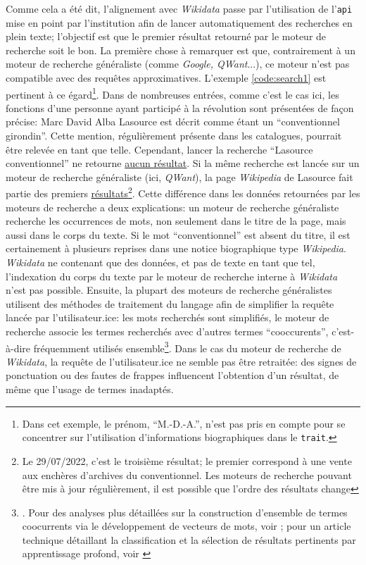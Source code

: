 \documentclass[a4paper, 12pt, twoside]{book}
\newcommand{\api}{\texttt{\gls{api}}}
\newcommand{\ttrait}{\texttt{trait}}
\newcommand{\wkd}{\textit{Wikidata}}
\begin{document}
Comme cela a été dit, l'alignement avec \wkd{} passe par l'utilisation de l'\api{} mise en point par l'institution afin de lancer automatiquement des recherches en plein texte; l'objectif est que le premier résultat retourné par le moteur de recherche soit le bon. La première chose à remarquer est que, contrairement à un moteur de recherche généraliste (comme \textit{Google, QWant}...), ce moteur n'est pas compatible avec des requêtes approximatives. L'exemple \ref{code:search1} est pertinent à ce égard\footnote{Dans cet exemple, le prénom, \enquote{M.-D.-A.}, n'est pas pris en compte pour se concentrer sur l'utilisation d'informations biographiques dans le \ttrait{}.}. Dans de nombreuses entrées, comme c'est le cas ici, les fonctions d'une personne ayant participé à la révolution sont présentées de façon précise: Marc David Alba Lasource est décrit comme étant un \enquote{conventionnel girondin}. Cette mention, régulièrement présente dans les catalogues, pourrait être relevée en tant que telle. Cependant, lancer la recherche \enquote{Lasource conventionnel} ne retourne \href{https://www.wikidata.org/w/index.php?search=lasource+conventionnel&title=Special:Search&profile=advanced&fulltext=1&ns0=1&ns120=1}{aucun résultat}. Si la même recherche est lancée sur un moteur de recherche généraliste (ici, \textit{QWant}), la page \textit{Wikipedia} de Lasource fait partie des premiers \href{https://www.qwant.com/?q=lasource+conventionnel}{résultats}\footnote{Le 29/07/2022, c'est le troisième résultat; le premier correspond à une vente aux enchères d'archives du conventionnel. Les moteurs de recherche pouvant être mis à jour régulièrement, il est possible que l'ordre des résultats change}. Cette différence dans les données retournées par les moteurs de recherche a deux explications: un moteur de recherche généraliste recherche les occurrences de mots, non seulement dans le titre de la page, mais aussi dans le corps du texte. Si le mot \enquote{conventionnel} est absent du titre, il est certainement à plusieurs reprises dans une notice biographique type \textit{Wikipedia}. \wkd{} ne contenant que des données, et pas de texte en tant que tel, l'indexation du corps du texte par le moteur de recherche interne à \wkd{} n'est pas possible. Ensuite, la plupart des moteurs de recherche généralistes utilisent des méthodes de traitement du langage afin de simplifier la requête lancée par l'utilisateur.ice: les mots recherchés sont simplifiés, le moteur de recherche associe les termes recherchés avec d'autres termes \enquote{cooccurents}, c'est-à-dire fréquemment utilisés ensemble\footnote{\cite{noauthor_moteur_2022}. Pour des analyses plus détaillées sur la construction d'ensemble de termes coocurrents via le développement de vecteurs de mots, voir \cite{mikolov_efficient_2013}; pour un article technique détaillant la classification et la sélection de résultats pertinents par apprentissage profond, voir \cite{covington_deep_2016}}. Dans le cas du moteur de recherche de \wkd{}, la requête de l'utilisateur.ice ne semble pas être retraitée: des signes de ponctuation ou des fautes de frappes influencent l'obtention d'un résultat, de même que l'usage de termes inadaptés.
\end{document}
